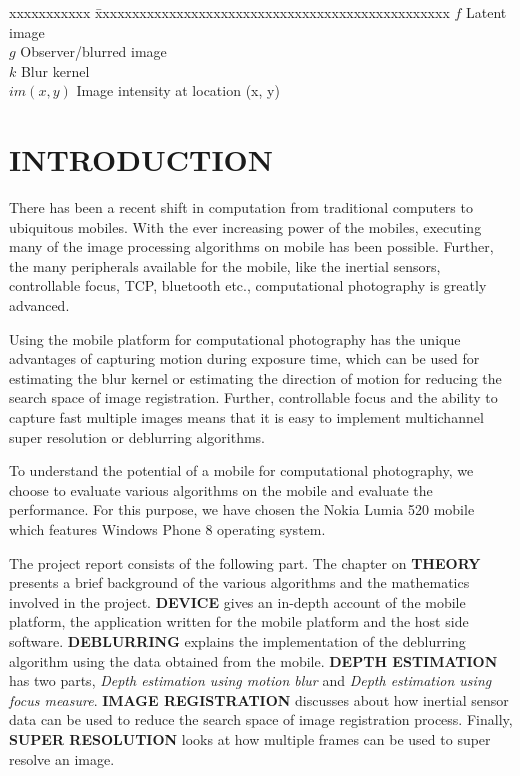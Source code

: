 \documentclass[BTech]{iitmdiss}
\begin{document}
\begin{singlespace}
\begin{tabbing}
xxxxxxxxxxx \= xxxxxxxxxxxxxxxxxxxxxxxxxxxxxxxxxxxxxxxxxxxxxxxx \kill
\textbf{$f$}    \> Latent image \\
\textbf{$g$}    \> Observer/blurred image \\
\textbf{$k$}    \> Blur kernel \\
\textbf{$im(x,y)$}  \> Image intensity at location (x, y) \\
\end{tabbing}
\end{singlespace}

\pagebreak


\chapter{INTRODUCTION}
\label{chap:intro}
There has been a recent shift in computation from traditional computers
to ubiquitous mobiles. With the ever increasing power of the mobiles, 
executing many of the image processing algorithms on mobile has been 
possible. Further, the many peripherals available for the mobile, like
the inertial sensors, controllable focus, TCP, bluetooth etc., 
computational photography is greatly advanced. 

Using the mobile platform for computational photography has the unique
advantages of capturing motion during exposure time, which can be used
for estimating the blur kernel or estimating the direction of motion
for reducing the search space of image registration. Further, 
controllable focus and the ability to capture fast multiple images means
that it is easy to implement multichannel super resolution or deblurring
algorithms. 

To understand the potential of a mobile for computational photography, 
we choose to evaluate various algorithms on the mobile and evaluate the 
performance. For this purpose, we have chosen the Nokia Lumia 520 mobile
which features Windows Phone 8 operating system. 

The project report consists of the following part. The chapter on 
\textbf{THEORY} presents a brief background of the various algorithms
and the mathematics involved in the project. \textbf{DEVICE} gives an
in-depth account of the mobile platform, the application written for the
mobile platform and the host side software. \textbf{DEBLURRING} 
explains the implementation of the deblurring algorithm using the data
obtained from the mobile. \textbf{DEPTH ESTIMATION} has two parts, 
\emph{Depth estimation using motion blur} and \emph{Depth estimation 
using focus measure}. \textbf{IMAGE REGISTRATION} discusses about how
inertial sensor data can be used to reduce the search space of image 
registration process. Finally, \textbf{SUPER RESOLUTION} looks at how 
multiple frames can be used to super resolve an image.
\end{document}
